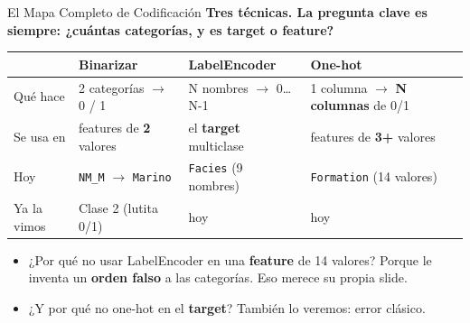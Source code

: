 \documentclass[aspectratio=169, 11pt]{beamer}
\begin{document}
\begin{frame}[shrink=10]{El Mapa Completo de Codificación}
  \vspace{-4pt}
  {\small\color{arcaDark}\bfseries
    Tres técnicas. La pregunta clave es siempre: ¿cuántas categorías, y es target o feature?}

  \vspace{6pt}
  {\footnotesize
  \begin{tabular}{@{}lp{3.4cm}p{3.4cm}p{4.4cm}@{}}
    \toprule
    & {\color{arcaDark}\bfseries Binarizar} & {\color{arcaDark}\bfseries LabelEncoder}
      & {\color{arcaDark}\bfseries One-hot} \\
    \midrule
    Qué hace & 2 categorías \(\to\) 0 / 1 & N nombres \(\to\) 0\ldots N-1
      & 1 columna \(\to\) \textbf{N columnas} de 0/1 \\
    Se usa en & features de \textbf{2} valores & el \textbf{target} multiclase
      & features de \textbf{3+} valores \\
    Hoy & \texttt{NM\_M} \(\to\) \texttt{Marino} & \texttt{Facies} (9 nombres)
      & \texttt{Formation} (14 valores) \\
    Ya la vimos & Clase 2 (lutita 0/1) & hoy & hoy \\
    \bottomrule
  \end{tabular}
  }

  \vspace{8pt}
  {\footnotesize\color{textMuted}
  \begin{itemize}\setlength{\itemsep}{3pt}
    \item[{\color{arcaRed}\scriptsize\faExclamationTriangle}]
      ¿Por qué no usar LabelEncoder en una \textbf{feature} de 14 valores?
      Porque le inventa un \textbf{orden falso} a las categorías. Eso merece su propia slide.
    \item[{\color{arcaRed}\scriptsize\faExclamationTriangle}]
      ¿Y por qué no one-hot en el \textbf{target}? También lo veremos: error clásico.
  \end{itemize}
  }
\end{frame}
\end{document}
